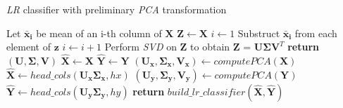 \begin{algorithm}
    \caption{\textit{LR} classifier with preliminary \textit{PCA} transformation}\label{alg:pca1}
    \begin{algorithmic}[1]
    
        \State Let $\boldsymbol{\bar{x}_i}$ be mean of an i-th column of $\boldsymbol{X}$
        \State $\boldsymbol{Z} \gets \boldsymbol{X}$
        \State $i \gets 1$
            \State Substruct $\boldsymbol{\bar{x}_i}$ from each element of $\boldsymbol{z}$ 
            \State $i \gets i+1$ 
        \EndFor
        \State Perform \textit{SVD} on $\boldsymbol{Z}$ to obtain $\boldsymbol{Z}$ = $\boldsymbol{U}\boldsymbol{\Sigma}\boldsymbol{V}^T$
        \State \textbf{return} $(\boldsymbol{U}, \boldsymbol{\Sigma}, \boldsymbol{V})$
    \EndFunction
    \State
        \State $\boldsymbol{\hat{X}} \gets \boldsymbol{X}$ 
        \State $\boldsymbol{\hat{Y}} \gets \boldsymbol{Y}$ 
            \State $(\boldsymbol{U_x}, \boldsymbol{\Sigma_{x}}, \boldsymbol{V_x}) \gets  computePCA(\boldsymbol{X})$
            \State $\boldsymbol{\hat{X}} \gets head\_cols(\boldsymbol{U_x\Sigma_{x}}, hx)$
        \EndIf
            \State $(\boldsymbol{U_y}, \boldsymbol{\Sigma_{y}}, \boldsymbol{V_y}) \gets computePCA(\boldsymbol{Y})$
            \State $\boldsymbol{\hat{Y}} \gets head\_cols(\boldsymbol{U_y\Sigma_{y}}, hy)$
        \EndIf
        \State \textbf{return} $build\_lr\_classifier(\boldsymbol{\hat{X}}, \boldsymbol{\hat{Y}})$ 
    \EndFunction
    \end{algorithmic}
\end{algorithm}

